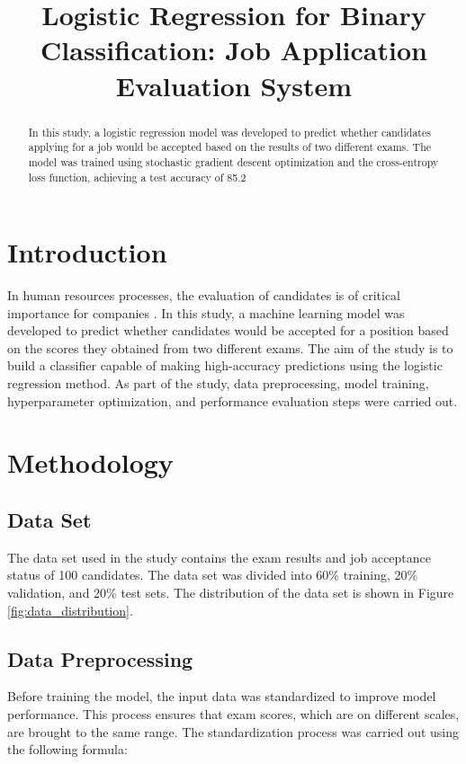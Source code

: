 \documentclass[conference]{IEEEtran}
\begin{document}
\title{Logistic Regression for Binary Classification: Job Application Evaluation System}

\author{
}

\maketitle

\begin{abstract}
In this study, a logistic regression model was developed to predict whether
candidates applying for a job would be accepted based on the results of two
different exams. The model was trained using stochastic gradient descent
optimization and the cross-entropy loss function, achieving a test accuracy
of 85.2%
\end{abstract}

\section{Introduction}
In human resources processes, the evaluation of candidates is of critical
importance for companies \cite{smith2023}. In this study, a machine learning
model was developed to predict whether candidates would be accepted for a
position based on the scores they obtained from two different exams. The aim of
the study is to build a classifier capable of making high-accuracy predictions
using the logistic regression method. As part of the study, data preprocessing,
model training, hyperparameter optimization, and performance evaluation steps
were carried out.

\section{Methodology}

\subsection{Data Set}
The data set used in the study contains the exam results and job acceptance
status of 100 candidates. The data set was divided into 60\% training, 20\%
validation, and 20\% test sets. The distribution of the data set is shown in
Figure \ref{fig:data_distribution}.

\subsection{Data Preprocessing}
Before training the model, the input data was standardized to improve model
performance. This process ensures that exam scores, which are on different
scales, are brought to the same range. The standardization process was carried
out using the following formula:
\end{document}
